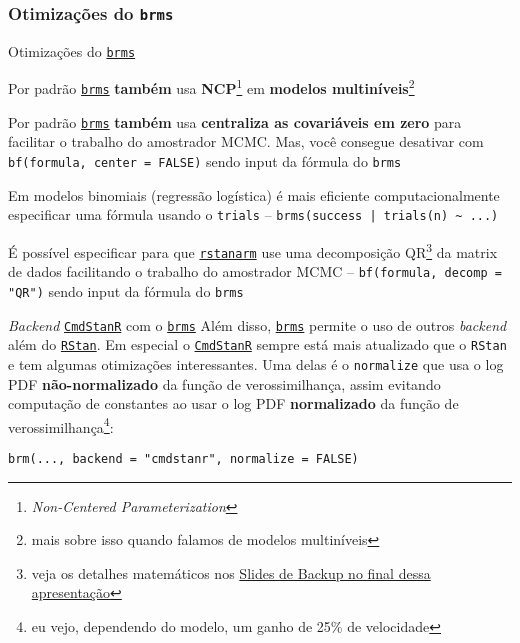 \subsubsection{Otimizações do \texttt{brms}}
\begin{frame}{Otimizações do \href{https://paul-buerkner.github.io/brms/}{\texttt{brms}}}
    \small
    \begin{vfilleditems}
        \item Por padrão \href{https://paul-buerkner.github.io/brms/}{\texttt{brms}}
        \textbf{também} usa \textbf{NCP}\footnote{\textit{Non-Centered Parameterization}}
        em \textbf{modelos multiníveis}\footnote{mais sobre isso quando falamos de modelos multiníveis}
        \item Por padrão \href{https://paul-buerkner.github.io/brms/}{\texttt{brms}}
        \textbf{também} usa \textbf{centraliza as covariáveis em zero} para facilitar o trabalho do amostrador
        MCMC. Mas, você consegue desativar com \lstinline!bf(formula, center = FALSE)! sendo
        input da fórmula do \texttt{brms}
        \item Em modelos binomiais (regressão logística) é mais eficiente computacionalmente
        especificar uma fórmula usando o \lstinline!trials! --
        \lstinline!brms(success | trials(n) ~ ...)!
        \item É possível especificar para que \href{http://mc-stan.org/rstanarm/}{\texttt{rstanarm}}
        use uma decomposição QR\footnote{veja os detalhes matemáticos nos \hyperlink{appendixqr}{Slides de Backup no final dessa apresentação}}
        da matrix de dados facilitando o trabalho do amostrador MCMC
        -- \lstinline!bf(formula, decomp = "QR")! sendo input da fórmula do
        \texttt{brms}
    \end{vfilleditems}
\end{frame}

\begin{frame}[fragile]{\textit{Backend} \href{https://mc-stan.org/cmdstanr/}{\texttt{CmdStanR}} com o \href{https://paul-buerkner.github.io/brms/}{\texttt{brms}}}
    Além disso, \href{https://paul-buerkner.github.io/brms/}{\texttt{brms}} permite
    o uso de outros \textit{backend} além do \href{https://mc-stan.org/rstan/}{\texttt{RStan}}.
    \vfill
    Em especial o \href{https://mc-stan.org/cmdstanr/}{\texttt{CmdStanR}}
    sempre está mais atualizado que o \texttt{RStan} e tem algumas otimizações interessantes.
    Uma delas é o \lstinline!normalize! que usa o log PDF \textbf{não-normalizado} da função
    de verossimilhança, assim evitando computação de constantes ao usar o log PDF
    \textbf{normalizado} da função de verossimilhança\footnote{eu vejo, dependendo do modelo, um ganho de 25\% de velocidade}:
    \begin{lstlisting}
brm(..., backend = "cmdstanr", normalize = FALSE)
    \end{lstlisting}
\end{frame}
